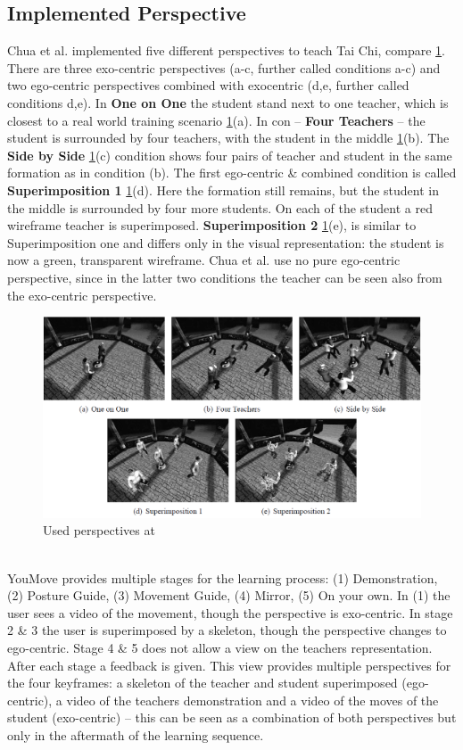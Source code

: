 \subsection{Implemented Perspective}
Chua et al. \cite{chua} implemented five different perspectives to teach Tai Chi, compare \ref{fig:taichiperspectives}. There are three exo-centric perspectives (a-c, further called conditions a-c) and two ego-centric perspectives combined with exocentric (d,e, further called conditions d,e). In \textbf{One on One} the student stand next to one teacher, which is closest to a real world training scenario \ref{fig:taichiperspectives}(a). In con \--- \textbf{Four Teachers} \--- the student is surrounded by four teachers, with the student in the middle \ref{fig:taichiperspectives}(b). The \textbf{Side by Side} \ref{fig:taichiperspectives}(c) condition shows four pairs of teacher and student in the same formation as in condition (b). The first ego-centric \& combined condition is called \textbf{Superimposition 1} \ref{fig:taichiperspectives}(d). Here the formation still remains, but the student in the middle is surrounded by four more students. On each of the student a red wireframe teacher is superimposed. \textbf{Superimposition 2} \ref{fig:taichiperspectives}(e), is similar to Superimposition one and differs only in the visual representation: the student is now a green, transparent wireframe. Chua et al. use no pure ego-centric perspective, since in the latter two conditions the teacher can be seen also from the exo-centric perspective.
\begin{figure}
	\centering
	\includegraphics[width=1.0\textwidth]{img/taichi_perspectives.png}
	\caption{Used perspectives at \cite{Chua}}
	\label{fig:taichiperspectives}
\end{figure}\\
YouMove \cite{Anderson2013} provides multiple stages for the learning process: (1) Demonstration, (2) Posture Guide, (3) Movement Guide, (4) Mirror, (5) On your own. In (1) the user sees a video of the movement, though the perspective is exo-centric. In stage 2 \& 3 the user is superimposed by a skeleton, though the perspective changes to ego-centric. Stage 4 \& 5 does not allow a view on the teachers representation. After each stage a feedback is given. This view provides multiple perspectives for the four keyframes: a skeleton of the teacher and student superimposed (ego-centric), a video of the teachers demonstration and a video of the moves of the student (exo-centric) \--- this can be seen as a combination of both perspectives but only in the aftermath of the learning sequence.
